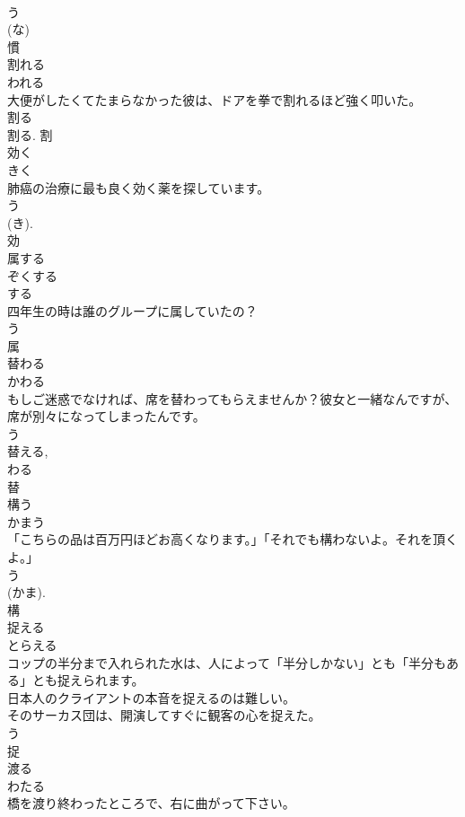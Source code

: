 \documentclass[8pt]{extreport}
\begin{document}
\begin{CJK}{UTF8}{min}
\\	う 
\\	(な) 
\\	慣	
\\	割れる	
\\	われる	
\\	大便がしたくてたまらなかった彼は、ドアを拳で割れるほど強く叩いた。	
\\	割る 
\\	割る.	割	
\\	効く	
\\	きく	
\\	肺癌の治療に最も良く効く薬を探しています。	
\\	う 
\\	(き). 
\\	効	
\\	属する	
\\	ぞくする	
\\	する 
\\	四年生の時は誰のグループに属していたの？	
\\	う 
\\	属	
\\	替わる	
\\	かわる	
\\	もしご迷惑でなければ、席を替わってもらえませんか？彼女と一緒なんですが、席が別々になってしまったんです。	
\\	う 
\\	替える, 
\\	わる 
\\	替	
\\	構う	
\\	かまう	
\\	「こちらの品は百万円ほどお高くなります。」「それでも構わないよ。それを頂くよ。」	
\\	う 
\\	(かま). 
\\	構	
\\	捉える	
\\	とらえる	
\\	コップの半分まで入れられた水は、人によって「半分しかない」とも「半分もある」とも捉えられます。	
\\	日本人のクライアントの本音を捉えるのは難しい。	
\\	そのサーカス団は、開演してすぐに観客の心を捉えた。	
\\	う 
\\	捉	
\\	渡る	
\\	わたる	
\\	橋を渡り終わったところで、右に曲がって下さい。	

\end{CJK}
\end{document}
